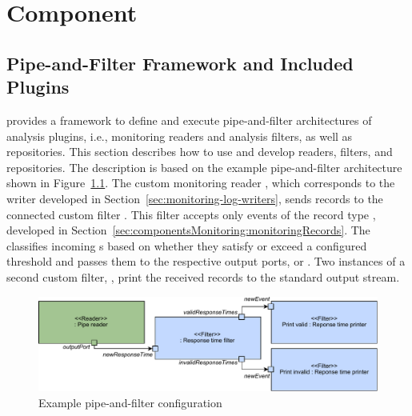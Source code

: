 %

\chapter{\KiekerAnalysisPart{} Component}\label{chap:componentsAnalysis}


\section{Pipe-and-Filter Framework and Included Plugins}\label{sec:analysis:controller}

\KiekerAnalysisPart{} provides a framework to define and execute pipe-and-filter %
architectures of analysis plugins, i.e., monitoring readers and analysis filters, %
as well as repositories. %
This section describes how to use and develop readers, filters, and %
repositories. The description is based on the example %
pipe-and-filter architecture shown in Figure~\ref{fig:example:pipe-and-filter}. The custom monitoring reader %
, which corresponds to the writer developed in Section~\ref{sec:monitoring-log-writers}, %
sends records to the connected custom filter . %
This filter accepts only events of the record type ,
developed in Section~\ref{sec:componentsMonitoring:monitoringRecords}. %
The  classifies incoming s %
based on whether they satisfy or exceed a configured threshold and passes them %
to the respective output ports,  or . %
Two instances of a second custom filter, , %
print the received records to the standard output stream.

\begin{figure}
\includegraphics[width=\textwidth]{images/example-pipe-and-filter}
\caption{Example pipe-and-filter configuration}
\label{fig:example:pipe-and-filter}
\end{figure}

